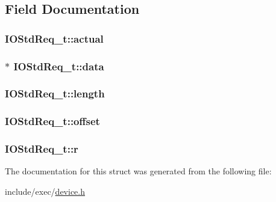 \subsection{Field Documentation}
\hypertarget{structIOStdReq__t_a7f5298d830e99dbc9787b8d01df25ebf}{
\subsubsection[{actual}]{ I\+O\+Std\+Req\+\_\+t\+::actual}}\label{structIOStdReq__t_a7f5298d830e99dbc9787b8d01df25ebf}
\hypertarget{structIOStdReq__t_a51d84e106324bf16e5025f25f64dfa7a}{
\subsubsection[{data}]{$\ast$ I\+O\+Std\+Req\+\_\+t\+::data}}\label{structIOStdReq__t_a51d84e106324bf16e5025f25f64dfa7a}
\hypertarget{structIOStdReq__t_ab328102b93e774e71cc13df74d9d13ae}{
\subsubsection[{length}]{ I\+O\+Std\+Req\+\_\+t\+::length}}\label{structIOStdReq__t_ab328102b93e774e71cc13df74d9d13ae}
\hypertarget{structIOStdReq__t_aa378339ba7159ca11ce04e9f18ba8a73}{
\subsubsection[{offset}]{ I\+O\+Std\+Req\+\_\+t\+::offset}}\label{structIOStdReq__t_aa378339ba7159ca11ce04e9f18ba8a73}
\hypertarget{structIOStdReq__t_a030e2acd54e401431b9b82eb3b17f6b2}{
\subsubsection[{r}]{ I\+O\+Std\+Req\+\_\+t\+::r}}\label{structIOStdReq__t_a030e2acd54e401431b9b82eb3b17f6b2}


The documentation for this struct was generated from the following file\+:\begin{DoxyCompactItemize}
\item 
include/exec/\hyperlink{device_8h}{device.\+h}\end{DoxyCompactItemize}
